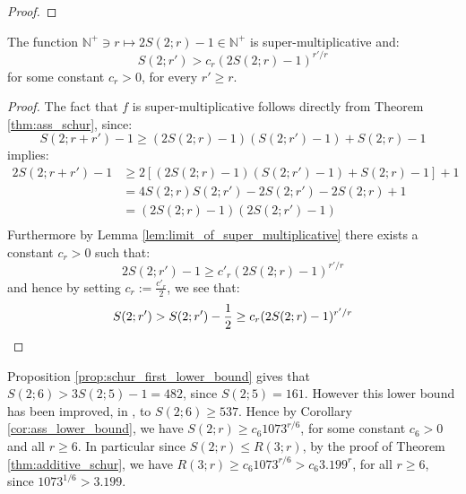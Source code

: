 \begin{proof}
\end{proof}

\begin{corollary}\label{cor:ass_lower_bound}
	The function $\mathbb{N}^{+} \ni r \mapsto 2S(2; r) - 1 \in \mathbb{N}^{+}$ is super-multiplicative and:
	\begin{equation*}
		S(2; r') > c_r(2S(2; r) - 1)^{r' / r}
	\end{equation*}
	for some constant $c_r > 0$, for every $r' \geq r$.
\end{corollary}
\begin{proof}
	The fact that $f$ is super-multiplicative follows directly from Theorem \ref{thm:ass_schur}, since:
	\begin{equation*}
		S(2; r + r') - 1 \geq (2S(2; r) -  1)(S(2; r') - 1) + S(2; r) - 1
	\end{equation*}
	implies:
	\begin{align*}
		2S(2; r + r') - 1 & \geq 2 \left[(2S(2; r) -  1)(S(2; r') - 1) + S(2; r) - 1\right] + 1 \\
		                 & = 4S(2; r)S(2; r') - 2S(2; r') - 2S(2; r) + 1                        \\
		                 & = (2S(2; r) - 1)(2S(2; r') - 1)                                    \\
	\end{align*}
	Furthermore by Lemma \ref{lem:limit_of_super_multiplicative} there exists a constant $c_r > 0$ such that:
	\begin{equation*}
		2S(2; r') - 1 \geq c'_r (2S(2; r) - 1)^{r' / r}
	\end{equation*}
	and hence by setting $c_r := \frac{c'_{r}}{2}$, we see that:
	\begin{equation*}
		S(2; r') > S(2; r') - \frac{1}{2} \geq c_{r} (2S(2; r) - 1)^{r' / r} \qedhere
	\end{equation*}
\end{proof}

Proposition \ref{prop:schur_first_lower_bound} gives that $S(2; 6) > 3S(2; 5) - 1 = 482$, since $S(2; 5) = 161$. However this lower bound has been improved, in \cite{lower_bound_for_s6}, to $S(2; 6) \geq 537$. Hence by Corollary \ref{cor:ass_lower_bound}, we have $S(2; r) \geq c_6 1073^{r / 6}$, for some constant $c_6 > 0$ and all $r \geq 6$. In particular since $S(2; r) \leq R(3; r)$, by the proof of Theorem \ref{thm:additive_schur}, we have $R(3; r) \geq c_6 1073^{r / 6} > c_6 3.199^{r}$, for all $r \geq 6$, since $1073^{1 / 6} > 3.199$.
